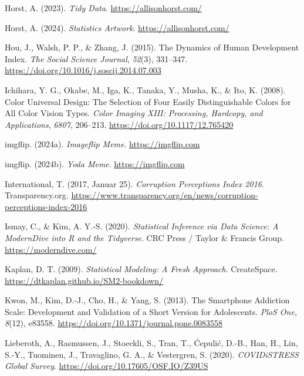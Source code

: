 \documentclass[
  a4paper,
]{scrbook}
\newlength{\cslhangindent}
\newenvironment{CSLReferences}[2] %
 {\begin{list}{}{%
  \setlength{\itemindent}{0pt}
  \setlength{\leftmargin}{0pt}
  \setlength{\parsep}{0pt}
  \ifodd #1
   \setlength{\leftmargin}{\cslhangindent}
   \setlength{\itemindent}{-1\cslhangindent}
  \fi
  \setlength{\itemsep}{#2\baselineskip}}}
 {\end{list}}
\theoremstyle{definition}
\theoremstyle{definition}
\theoremstyle{definition}
\theoremstyle{remark}
\begin{document}
\begin{CSLReferences}{1}{0}
Horst, A. (2023). \emph{Tidy {Data}}. \url{https://allisonhorst.com/}

Horst, A. (2024). \emph{Statistics {Artwork}}.
\url{https://allisonhorst.com/}

Hou, J., Walsh, P. P., \& Zhang, J. (2015). The Dynamics of {Human
Development Index}. \emph{The Social Science Journal}, \emph{52}(3),
331--347. \url{https://doi.org/10.1016/j.soscij.2014.07.003}

Ichihara, Y. G., Okabe, M., Iga, K., Tanaka, Y., Musha, K., \& Ito, K.
(2008). Color Universal Design: The Selection of Four Easily
Distinguishable Colors for All Color Vision Types. \emph{Color {Imaging
XIII}: {Processing}, {Hardcopy}, and {Applications}}, \emph{6807},
206--213. \url{https://doi.org/10.1117/12.765420}

imgflip. (2024a). \emph{Imageflip {Meme}}. \url{https://imgflip.com}

imgflip. (2024b). \emph{Yoda {Meme}}. \url{https://imgflip.com}

International, T. (2017, Januar 25). \emph{Corruption {Perceptions
Index} 2016}. Transparency.org.
\url{https://www.transparency.org/en/news/corruption-perceptions-index-2016}

Ismay, C., \& Kim, A. Y.-S. (2020). \emph{Statistical Inference via Data
Science: A {ModernDive} into {R} and the {Tidyverse}}. CRC Press /
Taylor \& Francis Group. \url{https://moderndive.com/}

Kaplan, D. T. (2009). \emph{Statistical Modeling: A Fresh Approach}.
CreateSpace. \url{https://dtkaplan.github.io/SM2-bookdown/}

Kwon, M., Kim, D.-J., Cho, H., \& Yang, S. (2013). The Smartphone
Addiction Scale: Development and Validation of a Short Version for
Adolescents. \emph{PloS One}, \emph{8}(12), e83558.
\url{https://doi.org/10.1371/journal.pone.0083558}

Lieberoth, A., Rasmussen, J., Stoeckli, S., Tran, T., Ćepulić, D.-B.,
Han, H., Lin, S.-Y., Tuominen, J., Travaglino, G. A., \& Vestergren, S.
(2020). \emph{{COVIDiSTRESS} Global Survey}.
\url{https://doi.org/10.17605/OSF.IO/Z39US}


\end{CSLReferences}
\end{document}
